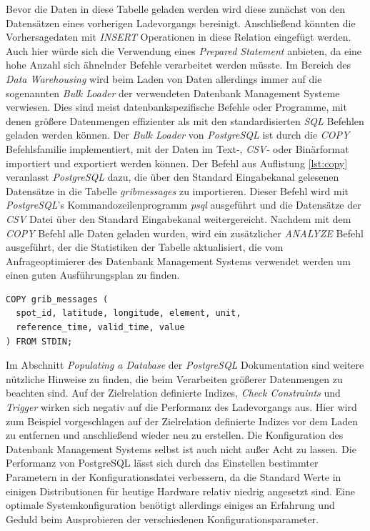 Bevor die Daten in diese Tabelle geladen werden wird diese zunächst
von den Datensätzen eines vorherigen Ladevorgangs
bereinigt. Anschließend könnten die Vorhersagedaten mit
\textit{INSERT} Operationen in diese Relation eingefügt werden. Auch
hier würde sich die Verwendung eines \textit{Prepared Statement}
anbieten, da eine hohe Anzahl sich ähnelnder Befehle verarbeitet
werden müsste. Im Bereich des \textit{Data Warehousing} wird beim
Laden von Daten allerdings immer auf die sogenannten \textit{Bulk
  Loader} der verwendeten Datenbank Management Systeme verwiesen. Dies
sind meist datenbankspezifische Befehle oder Programme, mit denen
größere Datenmengen effizienter als mit den standardisierten
\textit{SQL} Befehlen geladen werden können. Der \textit{Bulk Loader}
von \textit{PostgreSQL} ist durch die \textit{COPY} Befehlsfamilie
implementiert, mit der Daten im Text-, \textit{CSV-} oder Binärformat
importiert und exportiert werden können. Der Befehl aus Auflistung
\ref{lst:copy} veranlasst \textit{PostgreSQL} dazu, die über den
Standard Eingabekanal gelesenen Datensätze in die Tabelle
\textit{grib\textunderscore messages} zu importieren. Dieser Befehl
wird mit \textit{PostgreSQL}'s Kommandozeilenprogramm \textit{psql}
ausgeführt und die Datensätze der \textit{CSV} Datei über den Standard
Eingabekanal weitergereicht. Nachdem mit dem \textit{COPY} Befehl alle
Daten geladen wurden, wird ein zusätzlicher \textit{ANALYZE} Befehl
ausgeführt, der die Statistiken der Tabelle aktualisiert, die vom
Anfrageoptimierer des Datenbank Management Systems verwendet werden um
einen guten Ausführungsplan zu finden.

\begin{lstlisting}[captionpos=b, caption=Befehl zum Import von Datensätzen in \textit{PostgreSQL}, label=lst:copy]
COPY grib_messages (
  spot_id, latitude, longitude, element, unit, 
  reference_time, valid_time, value
) FROM STDIN;
\end{lstlisting}

Im Abschnitt \textit{Populating a Database} \cite{postgresql:populate}
der \textit{PostgreSQL} Dokumentation sind weitere nützliche Hinweise
zu finden, die beim Verarbeiten größerer Datenmengen zu beachten
sind. Auf der Zielrelation definierte Indizes, \textit{Check
  Constraints} und \textit{Trigger} wirken sich negativ auf die
Performanz des Ladevorgangs aus. Hier wird zum Beispiel vorgeschlagen
auf der Zielrelation definierte Indizes vor dem Laden zu entfernen und
anschließend wieder neu zu erstellen. Die Konfiguration des Datenbank
Management Systems selbst ist auch nicht außer Acht zu lassen. Die
Performanz von PostgreSQL lässt sich durch das Einstellen bestimmter
Parametern in der Konfigurationsdatei verbessern, da die Standard
Werte in einigen Distributionen für heutige Hardware relativ niedrig
angesetzt sind. Eine optimale Systemkonfiguration benötigt allerdings
einiges an Erfahrung und Geduld beim Ausprobieren der verschiedenen
Konfigurationsparameter.

